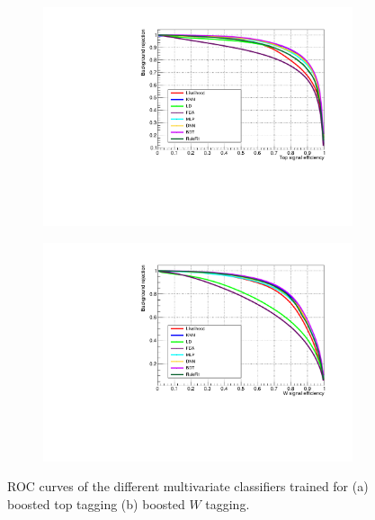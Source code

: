 \documentclass[main]{subfiles} %
\begin{document}
\begin{figure}[H]
     \centering
     \begin{subfigure}[h]{0.49\textwidth}
         \centering
         \includegraphics[width=\textwidth]{../Figures/Results/multiple_classifiers/top_multipleclassifiers.pdf}
          \caption{}
         \label{fig:top_multipleclassifiers}
     \end{subfigure}
     \begin{subfigure}[h]{0.49\textwidth}
         \centering
         \includegraphics[width=\textwidth]{../Figures/Results/multiple_classifiers/W_multipleclassifiers.pdf}
          \caption{}
         \label{fig:W_multipleclassifiers}
     \end{subfigure}
     \caption{ROC curves of the different multivariate classifiers trained for (a) boosted top tagging (b) boosted $W$ tagging.}
     \label{fig:ROC_classifiers}
\end{figure}
\end{document}

